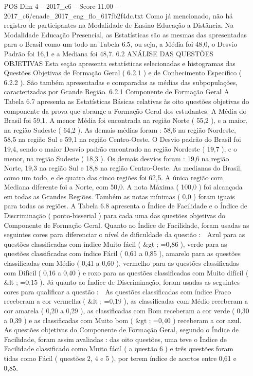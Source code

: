 \begin{textsample}{POS Dim 4 – 2017\_c6 – Score 11.00 – 2017\_c6/enade\_2017\_eng\_flo\_617fb2f4dc.txt}
Como já mencionado, não há registro de participantes na Modalidade de Ensino Educação a Distância.
Na Modalidade Educação Presencial, as Estatísticas são as mesmas das apresentadas para o Brasil como um todo na Tabela 6.5, ou seja, a Média foi 48,0, o Desvio Padrão foi 16,1 e a Mediana foi 48,7. 6.2 ANÁLISE DAS QUESTÕES OBJETIVAS Esta seção apresenta estatísticas selecionadas e histogramas das Questões Objetivas de Formação Geral ( 6.2.1 ) e de Conhecimento Específico ( 6.2.2 ).
São também apresentadas e comparadas as médias das subpopulações, caracterizadas por Grande Região. 6.2.1 Componente de Formação Geral A Tabela 6.7 apresenta as Estatísticas Básicas relativas às oito questões objetivas do componente da prova que abrange a Formação Geral dos estudantes.
A Média do Brasil foi 59,1.
A menor Média foi encontrada na região Norte ( 55,2 ), e a maior, na região Sudeste ( 64,2 ).
As demais médias foram : 58,6 na região Nordeste, 58,5 na região Sul e 59,1 na região Centro-Oeste.
O Desvio padrão do Brasil foi 19,4, sendo o maior Desvio padrão encontrado na região Nordeste ( 19,7 ), e o menor, na região Sudeste ( 18,3 ).
Os demais desvios foram : 19,6 na região Norte, 19,3 na região Sul e 18,8 na região Centro-Oeste.
As medianas do Brasil, como um todo, e de quatro das cinco regiões foi 62,5.
A única região com Mediana diferente foi a Norte, com 50,0.
A nota Máxima ( 100,0 ) foi alcançada em todas as Grandes Regiões.
Também as notas mínimas ( 0,0 ) foram iguais para todas as regiões.
A Tabela 6.8 apresenta o Índice de Facilidade e o Índice de Discriminação ( ponto-bisserial ) para cada uma das questões objetivas do Componente de Formação Geral.
Quanto ao Índice de Facilidade, foram usadas as seguintes cores para diferenciar o nível de dificuldade da questão :  Azul para as questões classificadas com índice Muito fácil ( \&gt ; =0,86 ), verde para as questões classificadas com índice Fácil ( 0,61 a 0,85 ), amarelo para as questões classificadas com Médio ( 0,41 a 0,60 ), vermelho para as questões classificadas com Difícil ( 0,16 a 0,40 ) e roxo para as questões classificadas com Muito difícil ( \&lt ; =0,15 ).
Já quanto ao Índice de Discriminação, foram usadas as seguintes cores para qualificar a questão :  As questões classificadas com índice Fraco receberam a cor vermelha ( \&lt ; =0,19 ), as classificadas com Médio receberam a cor amarela ( 0,20 a 0,29 ), as classificadas com Bom receberam a cor verde ( 0,30 a 0,39 ) e as classificadas com Muito bom ( \&gt ; =0,40 ) receberam a cor azul.
As questões objetivas do Componente de Formação Geral, segundo o Índice de Facilidade, foram assim avaliadas : das oito questões, uma teve o Índice de Facilidade classificado como Muito fácil ( a questão 6 ) e três questões foram tidas como Fácil ( questões 2, 4 e 5 ), por terem índice de acertos entre 0,61 e 0,85.

\end{textsample}
